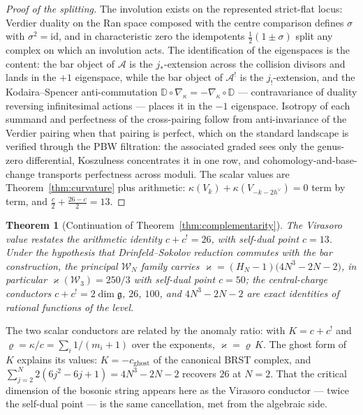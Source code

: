\documentclass[11pt]{amsart}
\numberwithin{equation}{section}
\theoremstyle{plain}
\newtheorem{theorem}{Theorem}[section]
\theoremstyle{definition}
\theoremstyle{remark}
\newcommand{\cA}{\mathcal{A}}
\newcommand{\cW}{\mathcal{W}}
\newcommand{\fg}{\mathfrak{g}}
\newcommand{\dvee}{h^{\vee}}
\begin{document}
\begin{proof}[Proof of the splitting]
The involution exists on the represented strict-flat locus: Verdier
duality on the Ran space composed with the centre comparison defines
$\sigma$ with $\sigma^{2}=\mathrm{id}$, and in characteristic zero the
idempotents $\tfrac12(1\pm\sigma)$ split any complex on which an
involution acts. The identification of the eigenspaces is the content:
the bar object of $\cA$ is the $j_{*}$-extension across the collision
divisors and lands in the $+1$ eigenspace, while the bar object of
$\cA^{!}$ is the $j_{!}$-extension, and the Kodaira--Spencer
anti-commutation $\mathbb{D}\circ\nabla_{\kappa}=-\nabla_{\kappa}
\circ\mathbb{D}$ --- contravariance of duality reversing infinitesimal
actions --- places it in the $-1$ eigenspace. Isotropy of each summand
and perfectness of the cross-pairing follow from anti-invariance of
the Verdier pairing when that pairing is perfect, which on the
standard landscape is verified through the PBW filtration: the
associated graded sees only the genus-zero differential, Koszulness
concentrates it in one row, and cohomology-and-base-change transports
perfectness across moduli. The scalar values are
Theorem~\ref{thm:curvature} plus arithmetic: $\kappa(V_k)+
\kappa(V_{-k-2\dvee})=0$ term by term, and
$\tfrac{c}{2}+\tfrac{26-c}{2}=13$.
\end{proof}

\begin{theorem}[Continuation of Theorem~\ref{thm:complementarity}]
\label{thm:complementarity-values}
The Virasoro value restates the arithmetic identity $c+c^{!}=26$, with
self-dual point $c=13$. Under the hypothesis that Drinfeld--Sokolov
reduction commutes with the bar construction, the principal
$\cW_N$ family carries
$\varkappa=(H_N-1)\bigl(4N^{3}-2N-2\bigr)$, in particular
$\varkappa(\cW_3)=250/3$ with self-dual point $c=50$; the central-charge
conductors $c+c^{!}=2\dim\fg$, $26$, $100$, and $4N^{3}-2N-2$ are exact
identities of rational functions of the level.
\end{theorem}

The two scalar conductors are related by the anomaly ratio: with
$K=c+c^{!}$ and $\varrho=\kappa/c=\sum_i 1/(m_i+1)$ over the exponents,
$\varkappa=\varrho\,K$. The ghost form of $K$ explains its values:
$K=-c_{\mathrm{ghost}}$ of the canonical BRST complex, and
$\sum_{j=2}^{N}2(6j^{2}-6j+1)=4N^{3}-2N-2$ recovers $26$ at $N=2$. That
the critical dimension of the bosonic string appears here as the Virasoro
conductor --- twice the self-dual point --- is the same cancellation,
met from the algebraic side.
\end{document}
